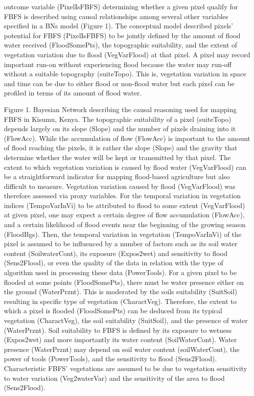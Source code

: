 \documentclass[12pt,oneside]{article}
\begin{document}
outcome variable (PixelIsFBFS) determining whether a given pixel qualify
for FBFS is described using causal relationships among several other
variables specified in a BNs model (Figure 1). The conceptual model
described pixels' potential for FBFS (PixelIsFBFS) to be jointly defined
by the amount of flood water received (FloodSomePts), the topographic
suitability, and the extent of vegetation variation due to flood
(VegVarFlood) at that pixel. A pixel may record important run-on without
experiencing flood because the water may run-off without a suitable
topography (suiteTopo). This is, vegetation variation in space and time
can be due to either flood or non-flood water but each pixel can be
profiled in terms of its amount of flood water.

Figure 1. Bayesian Network describing the causal reasoning used for
mapping FBFS in Kisumu, Kenya. The topographic suitability of a pixel
(suiteTopo) depends largely on its slope (Slope) and the number of
pixels draining into it (FlowAcc). While the accumulation of flow
(FlowAcc) is important to the amount of flood reaching the pixels, it is
rather the slope (Slope) and the gravity that determine whether the
water will be kept or transmitted by that pixel. The extent to which
vegetation variation is caused by flood water (VegVarFlood) can be a
straightforward indicator for mapping flood-based agriculture but also
difficult to measure. Vegetation variation caused by flood (VegVarFlood)
was therefore assessed via proxy variables. For the temporal variation
in vegetation indices (TempoVarInVi) to be attributed to flood to some
extent (VegVarFlood) at given pixel, one may expect a certain degree of
flow accumulation (FlowAcc), and a certain likelihood of flood events
near the beginning of the growing season (FloodBgs). Then, the temporal
variation in vegetation (TempoVarInVi) of the pixel is assumed to be
influenced by a number of factors such as its soil water content
(SoilwaterCont), its exposure (Expos2wet) and sensitivity to flood
(Sens2Flood), or even the quality of the data in relation with the type
of algorithm used in processing these data (PowerTools). For a given
pixel to be flooded at some points (FloodSomePts), there must be water
presence either on the ground (WaterPrznt). This is moderated by the
soils suitability (SuitSoil) resulting in specific type of vegetation
(CharactVeg). Therefore, the extent to which a pixel is flooded
(FloodSomePts) can be deduced from its typical vegetation (CharactVeg),
the soil suitability (SuitSoil), and the presence of water (WaterPrznt).
Soil suitability to FBFS is defined by its exposure to wetness
(Expos2wet) and more importantly its water content (SoilWaterCont).
Water presence (WaterPrznt) may depend on soil water content
(soilWaterCont), the power of tools (PowerTools), and the sensitivity to
flood (Sens2Flood). Characteristic FBFS' vegetations are assumed to be
due to vegetation sensitivity to water variation (Veg2waterVar) and the
sensitivity of the area to flood (Sens2Flood).
\end{document}
